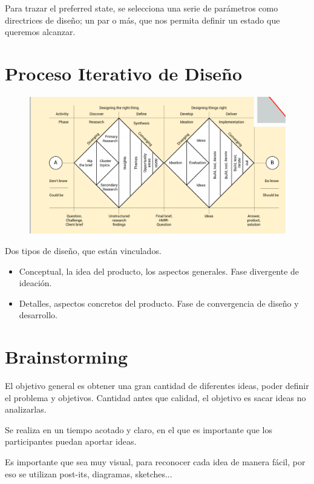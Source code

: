 \documentclass[12pt]{report} %
\begin{document}
Para trazar el preferred state, se selecciona una serie de parámetros como directrices de diseño; un par o más, que nos permita definir un estado que queremos alcanzar.

\section{Proceso Iterativo de Diseño}

\begin{figure}[H]
	{\includegraphics[scale=.4]{2021-03-20 21_09_36-L5.pdf - Foxit Reader.png}}
\end{figure}

Dos tipos de diseño, que están vinculados.
\begin{itemize}
  \item Conceptual, la idea del producto, los aspectos generales. Fase divergente de ideación.
  \item Detalles, aspectos concretos del producto. Fase de convergencia de diseño y desarrollo.
\end{itemize}

\section{Brainstorming}
El objetivo general es obtener una gran cantidad de diferentes ideas, poder definir el problema y objetivos. Cantidad antes que calidad, el objetivo es sacar ideas no analizarlas.

Se realiza en un tiempo acotado y claro, en el que es importante que los participantes puedan aportar ideas.

Es importante que sea muy visual, para reconocer cada idea de manera fácil, por eso se utilizan post-its, diagramas, sketches...
\end{document}
